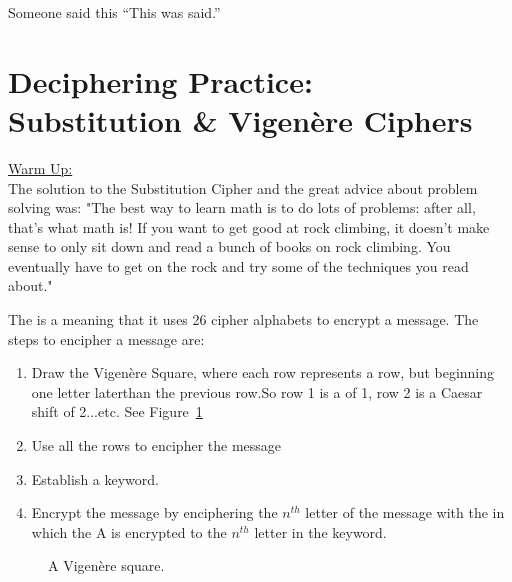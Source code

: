 \begin{chapquote}{Someone said this}
``This was said.''
\end{chapquote}

\section{Deciphering Practice: 
\\Substitution \& Vigen\`ere Ciphers}

\underline{Warm Up:}\\
The solution to the Substitution Cipher and the great advice about problem solving was: "The best way to learn math is to do lots of problems:  after all, that's what math is!  If you want to get good at rock climbing, it doesn't make sense to only sit down and read a bunch of books on rock climbing. You eventually have to get on the rock and try some of the techniques you read about."

The  is a  meaning that it uses 26 cipher alphabets to encrypt a message.
The steps to encipher a message are:
\begin{enumerate}
\item Draw the Vigen\`ere Square, where each row represents a  row, but beginning one letter laterthan the previous row.So row 1 is a  of 1, row 2 is a Caesar shift of 2...etc.  See Figure~\ref{fig:VigSquare}
\item Use all the rows to encipher the message
\item Establish a keyword.
\item Encrypt the message by enciphering the $n^{th}$ letter of the message with the  in which the A is encrypted to the $n^{th}$ letter in the keyword.
\end{enumerate}


\begin{figure}
\centering
{}
\caption{A Vigen\`ere square.}
\label{fig:VigSquare}
\end{figure}

